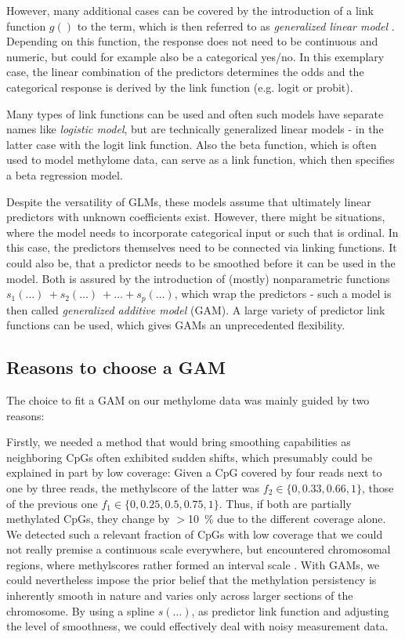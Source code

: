 However, many additional cases can be covered by the introduction of a link function $g()$ to the term, which is then referred to as \emph{generalized linear model} . Depending on this function, the response does not need to be continuous and numeric, but could for example also be a categorical yes/no. In this exemplary case, the linear combination of the predictors determines the odds and the categorical response is derived by the link function (e.g. logit or probit). 

Many types of link functions can be used and often such models have separate names like \emph{logistic model}, but are technically generalized linear models - in the latter case with the logit link function. Also the beta function, which is often used to model methylome data\cite{Kuan2010,Hebestreit2013,Song2013}, can serve as a link function, which then specifies a beta regression model. 

Despite the versatility of GLMs, these models assume that ultimately linear predictors with unknown coefficients exist. However, there might be situations, where the model needs to incorporate categorical input or such that is ordinal. In this case, the predictors themselves need to be connected via linking functions. It could also be, that a predictor needs to be smoothed before it can be used in the model. Both is assured by the introduction of (mostly) nonparametric functions $s_1(\ldots) \ + s_2(\ldots) \ + \ldots + s_p(\ldots)$, which wrap the predictors  - such a model is then called \emph{generalized additive model} (GAM).  A large variety of predictor link functions can be used, which gives GAMs an unprecedented flexibility.

\subsection{Reasons to choose a GAM}
\label{chap:r:gam:methylpredict:reasons}

The choice to fit a GAM on our methylome data was mainly guided by two reasons:

Firstly, we needed a method that would bring smoothing capabilities as neighboring CpGs often exhibited sudden shifts, which presumably could be explained in part by low coverage: Given a CpG covered by four reads next to one by three reads, the methylscore of the latter was $f_{2} \in 	\{ 0, 0.33, 0.66, 1 \}$, those of the previous one $f_{1} \in \{ 0, 0.25, 0.5, 0.75, 1 \}$. Thus, if both are partially methylated CpGs, they change by $>$\SI{10}{\percent} due to the different coverage alone. We detected such a relevant fraction of CpGs with low coverage that we could not really premise a continuous scale everywhere, but encountered chromosomal regions, where methylscores rather formed an interval scale . With GAMs, we could nevertheless impose the prior belief that the methylation persistency is inherently smooth in nature and varies only across larger sections of the chromosome. By using a spline $s(\ldots)$, as predictor link function and adjusting the level of smoothness, we could effectively deal with noisy measurement data. 

